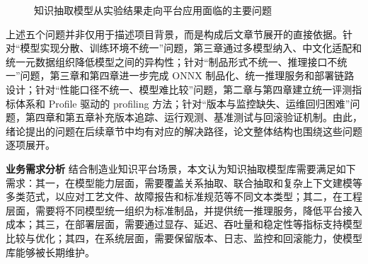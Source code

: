 \begin{figure}[htbp]
  \centering
  \caption{知识抽取模型从实验结果走向平台应用面临的主要问题}
  \label{fig:intro_problem_map}
\end{figure}

上述五个问题并非仅用于描述项目背景，而是构成后文章节展开的直接依据。针对“模型实现分散、训练环境不统一”问题，第三章通过多模型纳入、中文化适配和统一元数据组织降低模型之间的异构性；针对“制品形式不统一、推理接口不统一”问题，第三章和第四章进一步完成 ONNX 制品化、统一推理服务和部署链路设计；针对“性能口径不统一、模型难比较”问题，第二章与第四章建立统一评测指标体系和 Profile 驱动的 profiling 方法；针对“版本与监控缺失、运维回归困难”问题，第四章和第五章补充版本追踪、运行观测、基准测试与回滚验证机制。由此，绪论提出的问题在后续章节中均有对应的解决路径，论文整体结构也围绕这些问题逐项展开。

\par\textbf{业务需求分析}
结合制造业知识平台场景，本文认为知识抽取模型库需要满足如下需求：其一，在模型能力层面，需要覆盖关系抽取、联合抽取和复杂上下文建模等多类范式，以应对工艺文件、故障报告和标准规范等不同文本类型；其二，在工程层面，需要将不同模型统一组织为标准制品，并提供统一推理服务，降低平台接入成本；其三，在部署层面，需要通过显存、延迟、吞吐量和稳定性等指标支持模型比较与优化；其四，在系统层面，需要保留版本、日志、监控和回滚能力，使模型库能够被长期维护。

